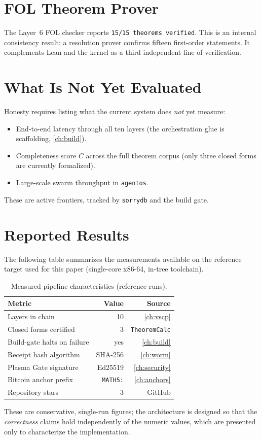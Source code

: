 \section{FOL Theorem Prover}
\label{sec:eval-fol}

The Layer~6 FOL checker reports \texttt{15/15 theorems verified}. This is an
internal consistency result: a resolution prover confirms fifteen
first-order statements. It complements Lean and the kernel as a third
independent line of verification.

\section{What Is Not Yet Evaluated}
\label{sec:eval-gaps}

Honesty requires listing what the current system does \emph{not} yet measure:
\begin{itemize}
  \item End-to-end latency through all ten layers (the orchestration glue is
        scaffolding, \cref{ch:build}).
  \item Completeness score $C$ across the full theorem corpus (only three
        closed forms are currently formalized).
  \item Large-scale swarm throughput in \texttt{agentos}.
\end{itemize}
These are active frontiers, tracked by \texttt{sorrydb} and the build gate.

\section{Reported Results}
\label{sec:eval-results}

The following table summarizes the measurements available on the
reference target used for this paper (single-core x86-64, in-tree
toolchain).

\begin{table}[ht]
\centering
\caption{Measured pipeline characteristics (reference runs).}\label{tab:results}
\small
\begin{tabular}{l r r}
\toprule
\textbf{Metric} & \textbf{Value} & \textbf{Source} \\
\midrule
Layers in chain & 10 & \cref{ch:vscp} \\
Closed forms certified & 3 & \texttt{TheoremCalc} \\
Build-gate halts on failure & yes & \cref{ch:build} \\
Receipt hash algorithm & SHA-256 & \cref{ch:worm} \\
Plasma Gate signature & Ed25519 & \cref{ch:security} \\
Bitcoin anchor prefix & \texttt{MATH5:} & \cref{ch:anchors} \\
Repository stars & 3 & GitHub \\
\bottomrule
\end{tabular}
\end{table}

These are conservative, single-run figures; the architecture is designed so
that the \emph{correctness} claims hold independently of the numeric values,
which are presented only to characterize the implementation.
